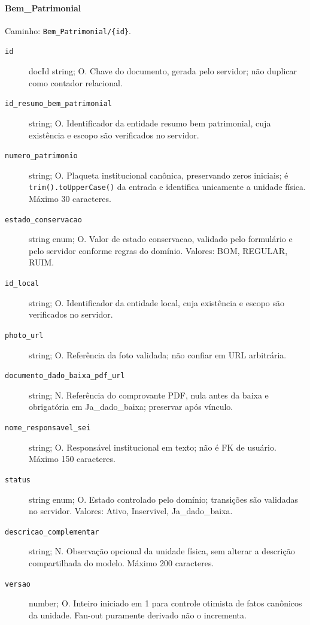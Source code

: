\paragraph{Bem\_Patrimonial}\mbox{}\par
Caminho: \texttt{Bem\_Patrimonial/\{id\}}.
\begin{description}
\item[\texttt{id}] docId string; O. Chave do documento, gerada pelo servidor; não duplicar como contador relacional.
\item[\texttt{id\_resumo\_bem\_patrimonial}] string; O. Identificador da entidade resumo bem patrimonial, cuja existência e escopo são verificados no servidor.
\item[\texttt{numero\_patrimonio}] string; O. Plaqueta institucional canônica, preservando zeros iniciais; é \texttt{trim().toUpperCase()} da entrada e identifica unicamente a unidade física. Máximo 30 caracteres.
\item[\texttt{estado\_conservacao}] string enum; O. Valor de estado conservacao, validado pelo formulário e pelo servidor conforme regras do domínio. Valores: BOM, REGULAR, RUIM.
\item[\texttt{id\_local}] string; O. Identificador da entidade local, cuja existência e escopo são verificados no servidor.
\item[\texttt{photo\_url}] string; O. Referência da foto validada; não confiar em URL arbitrária.
\item[\texttt{documento\_dado\_baixa\_pdf\_url}] string; N. Referência do comprovante PDF, nula antes da baixa e obrigatória em Ja\_dado\_baixa; preservar após vínculo.
\item[\texttt{nome\_responsavel\_sei}] string; O. Responsável institucional em texto; não é FK de usuário. Máximo 150 caracteres.
\item[\texttt{status}] string enum; O. Estado controlado pelo domínio; transições são validadas no servidor. Valores: Ativo, Inservivel, Ja\_dado\_baixa.
\item[\texttt{descricao\_complementar}] string; N. Observação opcional da unidade física, sem alterar a descrição compartilhada do modelo. Máximo 200 caracteres.
\item[\texttt{versao}] number; O. Inteiro iniciado em 1 para controle otimista de fatos canônicos da unidade. Fan-out puramente derivado não o incrementa.
\end{description}

